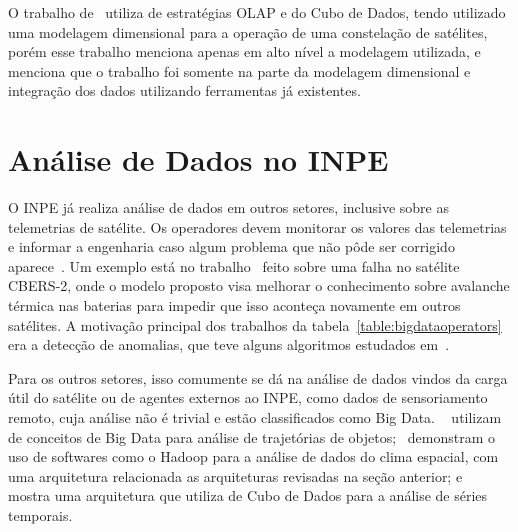 O trabalho de~\cite{yvernesCopernicusGroundSegment2018} utiliza de estratégias OLAP e do Cubo de Dados, tendo utilizado uma modelagem dimensional para a operação de uma constelação de satélites, porém esse trabalho menciona apenas em alto nível a modelagem utilizada, e menciona que o trabalho foi somente na parte da modelagem dimensional e integração dos dados utilizando ferramentas já existentes.

\section{Análise de Dados no INPE}
\label{ch:corr:inpe}

O INPE já realiza análise de dados em outros setores, inclusive sobre as telemetrias de satélite.
Os operadores devem monitorar os valores das telemetrias e informar a engenharia caso algum problema que não pôde ser corrigido aparece~\cite{TominagaFerrAmbr:2017:CoSaTe}.
Um exemplo está no trabalho~\cite{Magalhaes:2012:EsAvTe} feito sobre uma falha no satélite CBERS-2, onde o modelo proposto visa melhorar o conhecimento sobre avalanche térmica nas baterias para impedir que isso aconteça novamente em outros satélites.
A motivação principal dos trabalhos da tabela~\ref{table:bigdataoperators} era a detecção de anomalias, que teve alguns algoritmos estudados em~\cite{AzevedoAmbrViei::EsSoTe}.

Para os outros setores, isso comumente se dá na análise de dados vindos da carga útil do satélite ou de agentes externos ao INPE, como dados de sensoriamento remoto, cuja análise não é trivial e estão classificados como Big Data.
~\cite{monteiroFRAMEWORKTRAJECTORYDATA2017} utilizam de conceitos de Big Data para análise de trajetórias de objetos;~\cite{ramosDistributedSystemsPerformance2016} demonstram o uso de softwares como o Hadoop para a análise de dados do clima espacial, com uma arquitetura relacionada as arquiteturas revisadas na seção anterior; e~\cite{SimoesCamaQuei:2018:DaAnMa} mostra uma arquitetura que utiliza de Cubo de Dados para a análise de séries temporais.

